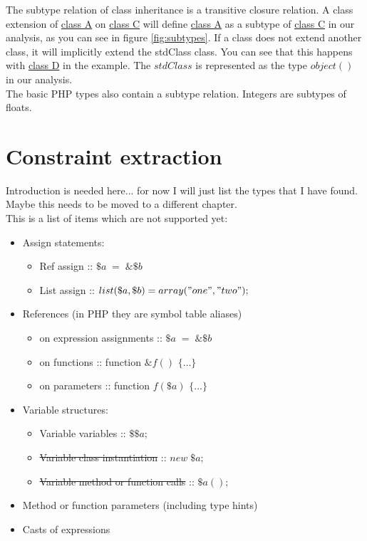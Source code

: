 \documentclass[../main.tex]{subfiles}
\begin{document}
    The subtype relation of class inheritance is a \gls{transitive closure} relation.
    A class extension of \underline{class A} on \underline{class C} will define \underline{class A} as a subtype of \underline{class C} in our analysis, as you can see in figure \ref{fig:subtypes}.
    If a class does not extend another class, it will implicitly extend the \gls{stdClass} class.
    You can see that this happens with \underline{class D} in the example.
    The $stdClass$ is represented as the type $object()$ in our analysis.
    \\
    The basic PHP types also contain a subtype relation.
    Integers are subtypes of floats.

    \section{Constraint extraction}
       
    Introduction is needed here... for now I will just list the types that I have found.
    Maybe this needs to be moved to a different chapter.
    \\
    This is a list of items which are not supported yet:

    \begin{itemize}
        \item Assign statements:
        \begin{itemize}
            \item Ref assign :: $\$a \; = \; \&\$b$
            \item List assign :: $list(\$a, \$b) = array("one", "two");$
        \end{itemize}
        
        \item References (in PHP they are symbol table aliases)
        \begin{itemize}
            \item on expression assignments :: $\$a \; = \; \&\$b$
            \item on functions :: function $\&f()$ $\{ \dots \}$
            \item on parameters :: function $f(\$a)$ $\{ \dots \}$             
        \end{itemize}

        \item Variable structures:
        \begin{itemize}
            \item Variable variables :: $\$\$a;$
            \item \sout{Variable class instantiation} :: $new \; \$a;$
            \item \sout{Variable method or function calls} :: $\$a();$
        \end{itemize}
        
        \item Method or function parameters (including type hints)
        
        \item Casts of expressions
        
        
    \end{itemize}
\end{document}
